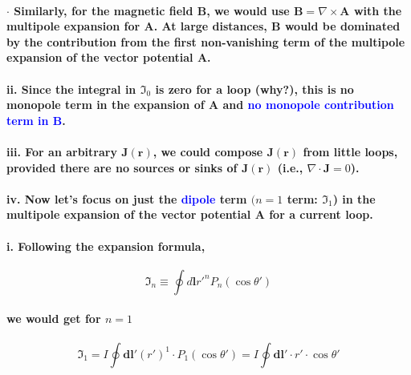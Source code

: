\documentclass{article}
\begin{document}
\paragraph{\indent $\cdot$ Similarly, for the magnetic field $\boldsymbol{B}$, we would use $\boldsymbol{B}=\nabla\times\boldsymbol{A}$ with the multipole expansion for $\boldsymbol{A}$. At large distances, $\boldsymbol{B}$ would be dominated by the contribution from the first non-vanishing term of the multipole expansion of the vector potential $\boldsymbol{A}$.}
\paragraph{\indent ii. Since the integral in $\mathfrak{I}_0$ is zero for a loop (why?), this is no monopole term in the expansion of $\boldsymbol{A}$ and \textcolor{blue}{no monopole contribution term in $\boldsymbol{B}$}.}
\paragraph{\indent iii. For an arbitrary $\boldsymbol{J}(\boldsymbol{r})$, we could compose $\boldsymbol{J}(\boldsymbol{r})$ from little loops, provided there are no sources or sinks of $\boldsymbol{J}(\boldsymbol{r})$ (i.e., $\nabla\cdot\boldsymbol{J}=0$).}
\paragraph{\indent iv. Now let's focus on just the \textcolor{blue}{dipole} term $(n=1$ term: $\mathfrak{I}_1$) in the multipole expansion of the vector potential $\boldsymbol{A}$ for a current loop.}
\paragraph{\indent\indent i. Following the expansion formula,}
\begin{equation*}
    \mathfrak{I}_n\equiv\oint d\boldsymbol{l}r'^n P_n(\cos\theta')
\end{equation*}
\paragraph{we would get for $n=1$}
\begin{equation*}
    \mathfrak{I}_1=I\oint\boldsymbol{dl}'(r')^1\cdot P_1(\cos\theta')=I\oint\boldsymbol{dl}'\cdot r'\cdot\cos\theta'
\end{equation*}
\end{document}
